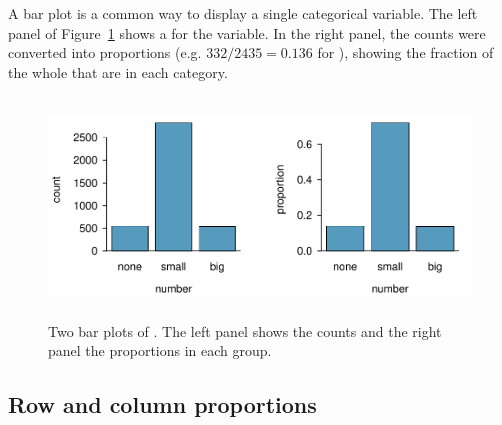 
A bar plot is a common way to display a single categorical variable. The left panel of Figure~\ref{emailNumberBarPlot} shows a  for the  variable. In the right panel, the counts were converted into proportions (e.g. $332/2435=0.136$ for ), 
showing the fraction of the whole that are in each category.
\begin{figure}[bht]
   \centering
   \includegraphics[height=2.3in]{01/figures/emailNumberBarPlot/emailNumberBarPlot}
   \caption{Two bar plots of . The left panel shows the counts and the right panel the proportions in each group.}
   \label{emailNumberBarPlot} %
\end{figure}


\subsection{Row and column proportions}

